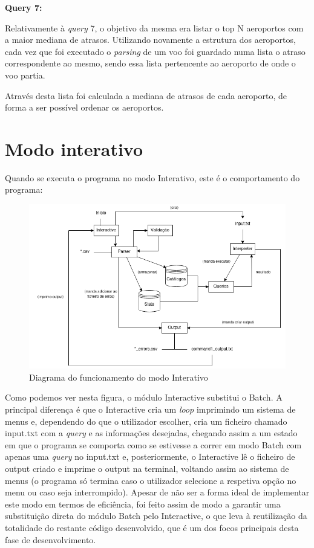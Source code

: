 \documentclass[12pt,a4paper]{report}
\begin{document}
     \textbf{Query 7:}
    \par Relativamente à \textit{query} 7, o objetivo da mesma era listar o top N aeroportos com a maior mediana de atrasos.
    Utilizando novamente a estrutura dos aeroportos, cada vez que foi executado o \textit{parsing} de um voo foi guardado numa lista o atraso correspondente ao mesmo, sendo essa lista pertencente ao aeroporto de onde o voo partia.
    \par Através desta lista foi calculada a mediana de atrasos de cada aeroporto, de forma a ser possível ordenar os aeroportos.
    
    
    \chapter{Modo interativo}
    \par Quando se executa o programa no modo Interativo, este é o comportamento do programa:    
    
    \begin{figure}[h]
    \includegraphics[scale = 0.6]{Interactive.png}
    \centering
    \caption{Diagrama do funcionamento do modo Interativo}
    \end{figure} 

    \par Como podemos ver nesta figura, o módulo Interactive substitui o Batch. A principal diferença é que o Interactive cria um \textit{loop} imprimindo um sistema de menus e, dependendo do que o utilizador escolher, cria um ficheiro chamado input.txt com a \textit{query} e as informações desejadas, chegando assim a um estado em que o programa se comporta como se estivesse a correr em modo Batch com apenas uma \textit{query} no input.txt e, posteriormente, o Interactive lê o ficheiro de output criado e imprime o output na terminal, voltando assim ao sistema de menus (o programa só termina caso o utilizador selecione a respetiva opção no menu ou caso seja interrompido). Apesar de não ser a forma ideal de implementar este modo em termos de eficiência, foi feito assim de modo a garantir uma substituição direta do módulo Batch pelo Interactive, o que leva à reutilização da totalidade do restante código desenvolvido, que é um dos focos principais desta fase de desenvolvimento. 
\end{document}
